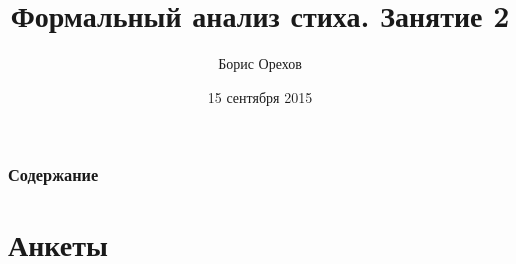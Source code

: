 \documentclass{beamer}
\title[Занятие 2]{Формальный анализ стиха. Занятие 2} %
\author{Борис Орехов} %
\institute[НИУ ВШЭ] %
{
НИУ Высшая школа экономики \\ %
\medskip
\textit{nevmenandr@gmail.com} %
}
\date{15 сентября 2015} %
\begin{document}
\begin{frame}
\titlepage %
\end{frame}



\begin{frame}
\frametitle{Содержание}  %
\tableofcontents %
\end{frame}




\section{Анкеты}\label{sec:ank} %


\end{document}
